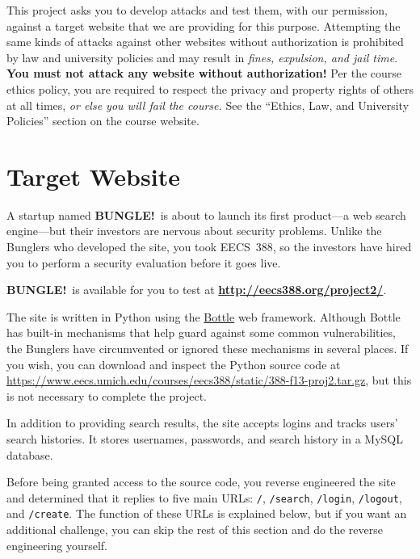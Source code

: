 \documentclass[letterpaper,12pt]{article}
\begin{document}
{This project asks you to develop attacks and test them, with our permission, against a target website that we are providing for this purpose.  Attempting the same kinds of attacks against other websites without authorization is prohibited by law and university policies and may result in \emph{fines, expulsion, and jail time}.   \textbf{You must not attack any website without authorization!}  Per the course ethics policy, you are required to respect the privacy and  property rights of others at all times, \emph{or else you will fail the course.}  See the ``Ethics, Law, and University Policies'' section on the course website.

\newpage

\section*{Target Website}
\renewcommand{\note}[1]{\textsl{#1}}
\newcommand\bungle{\textsf{\bfseries{B{\scriptsize UNGLE}!}}}

A startup named \bungle\ is about to launch its first product---a web search engine---but their investors are nervous about security problems.  Unlike the Bunglers who developed the site, you took EECS~388, so the investors have hired you to perform a security evaluation before it goes live.

\medskip

\bungle\ is available for you to test at \textbf{\url{http://eecs388.org/project2/}}.

\medskip

The site is written in Python using the  \href{http://www.bottlepy.org/}{Bottle} web framework. Although Bottle has built-in mechanisms that help guard against some common vulnerabilities, the Bunglers have circumvented or ignored these mechanisms in several places.  If you wish, you can download and inspect the Python source code at \url{https://www.eecs.umich.edu/courses/eecs388/static/388-f13-proj2.tar.gz}, but this is not necessary to complete the project.

\medskip

In addition to providing search results, the site accepts logins and tracks users' search histories. It stores usernames, passwords, and search history in a MySQL database.

\medskip

Before being granted access to the source code, you reverse engineered the site and determined that it replies to five main URLs: \texttt{/}, \texttt{/search}, \texttt{/login}, \texttt{/logout}, and \texttt{/create}.  The function of these URLs is explained below, but if you want an additional challenge, you can skip the rest of this section and do the reverse engineering yourself.

}
\end{document}
